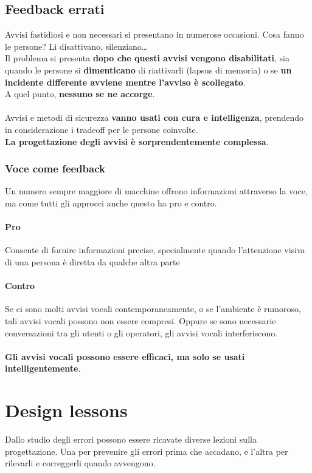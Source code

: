 \documentclass[10pt]{article}
\begin{document}
\subsection{Feedback errati}
Avvisi fastidiosi e non necessari si presentano in numerose occasioni. Cosa fanno le persone? Li disattivano, silenziano\ldots\\
Il problema si presenta \textbf{dopo che questi avvisi vengono disabilitati}, sia quando le persone si \textbf{dimenticano} di riattivarli (lapsus di memoria) o se \textbf{un incidente differente avviene mentre l'avviso è scollegato}.\\
A quel punto, \textbf{nessuno se ne accorge}.\\\\
Avvisi e metodi di sicurezza \textbf{vanno usati con cura e intelligenza}, prendendo in considerazione  i tradeoff per le persone coinvolte.\\
\textbf{La progettazione degli avvisi è sorprendentemente complessa}.
\pagebreak
\subsubsection{Voce come feedback}
Un numero sempre maggiore di macchine offrono informazioni attraverso la voce, ma come tutti gli approcci anche questo ha pro e contro.
\paragraph{Pro} Consente di fornire informazioni precise, specialmente quando l'attenzione visiva di una persona è diretta da qualche altra parte
\paragraph{Contro} Se ci sono molti avvisi vocali contemporaneamente, o se l'ambiente è rumoroso, tali avvisi vocali possono non essere compresi. Oppure se sono necessarie conversazioni tra gli utenti o gli operatori, gli avvisi vocali interferiscono.\\\\
\textbf{Gli avvisi vocali possono essere efficaci, ma solo se usati intelligentemente}.
\section{Design lessons}
Dallo studio degli errori possono essere ricavate diverse lezioni sulla progettazione. Una per prevenire gli errori prima che accadano, e l'altra per rilevarli e correggerli quando avvengono.
\end{document}
